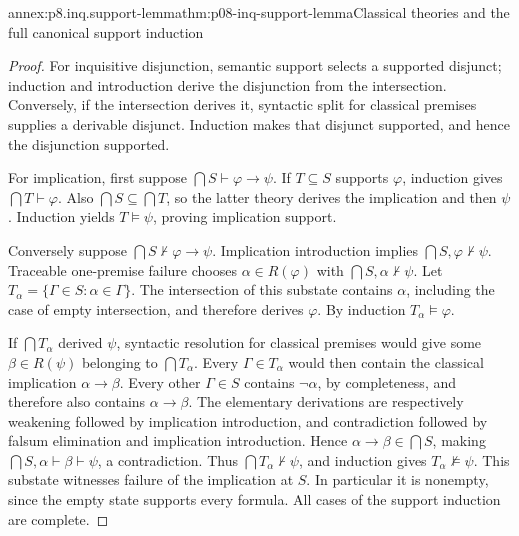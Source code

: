 \begin{annexitem}{annex:p8.inq.support-lemma}{thm:p08-inq-support-lemma}{Classical theories and the full canonical support induction}
\begin{proof}
For inquisitive disjunction, semantic support selects a supported disjunct;
induction and introduction derive the disjunction from the intersection.
Conversely, if the intersection derives it, syntactic split for classical
premises supplies a derivable disjunct. Induction makes that disjunct
supported, and hence the disjunction supported.

For implication, first suppose \(\bigcap S\vdash\varphi\to\psi\).
If \(T\subseteq S\) supports \(\varphi\), induction gives
\(\bigcap T\vdash\varphi\). Also \(\bigcap S\subseteq\bigcap T\),
so the latter theory derives the implication and then \(\psi\).
Induction yields \(T\models\psi\), proving implication support.

Conversely suppose \(\bigcap S\not\vdash\varphi\to\psi\).
Implication introduction implies \(\bigcap S,\varphi\not\vdash\psi\).
Traceable one-premise failure chooses \(\alpha\in R(\varphi)\) with
\(\bigcap S,\alpha\not\vdash\psi\). Let
\(T_\alpha=\{\Gamma\in S:\alpha\in\Gamma\}\).
The intersection of this substate contains \(\alpha\), including the
case of empty intersection, and therefore derives \(\varphi\).
By induction \(T_\alpha\models\varphi\).

If \(\bigcap T_\alpha\) derived \(\psi\), syntactic resolution for
classical premises would give some \(\beta\in R(\psi)\) belonging to
\(\bigcap T_\alpha\). Every \(\Gamma\in T_\alpha\) would then
contain the classical implication \(\alpha\to\beta\). Every other
\(\Gamma\in S\) contains \(\neg\alpha\), by completeness, and
therefore also contains \(\alpha\to\beta\). The elementary derivations
are respectively weakening followed by implication introduction, and
contradiction followed by falsum elimination and implication introduction.
Hence \(\alpha\to\beta\in\bigcap S\), making
\(\bigcap S,\alpha\vdash\beta\vdash\psi\), a contradiction.
Thus \(\bigcap T_\alpha\not\vdash\psi\), and induction gives
\(T_\alpha\not\models\psi\). This substate witnesses failure of the
implication at \(S\). In particular it is nonempty, since the empty
state supports every formula. All cases of the support induction are complete.
\end{proof}
\end{annexitem}

